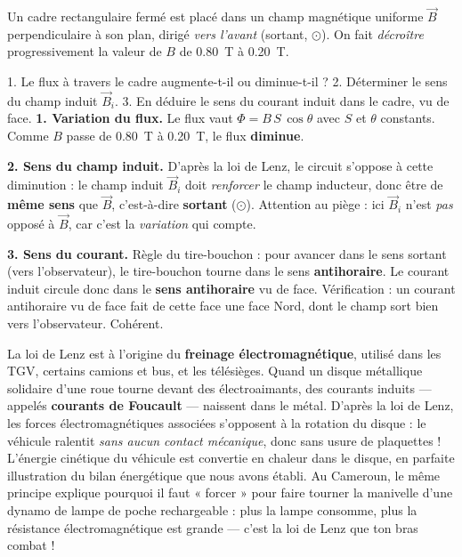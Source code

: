 \documentclass[11pt]{article}
\begin{document}
\begin{exoresolu}
Un cadre rectangulaire fermé est placé dans un champ magnétique uniforme $\vec{B}$ perpendiculaire à son plan, dirigé \emph{vers l'avant} (sortant, $\odot$). On fait \emph{décroître} progressivement la valeur de $B$ de \SI{0,80}{\tesla} à \SI{0,20}{\tesla}.

1. Le flux à travers le cadre augmente-t-il ou diminue-t-il ?
2. Déterminer le sens du champ induit $\vec{B}_i$.
3. En déduire le sens du courant induit dans le cadre, vu de face.
\tcblower
\textbf{1. Variation du flux.} Le flux vaut $\Phi = B\,S\,\cos\theta$ avec $S$ et $\theta$ constants. Comme $B$ passe de \SI{0,80}{\tesla} à \SI{0,20}{\tesla}, le flux \textbf{diminue}.

\textbf{2. Sens du champ induit.} D'après la loi de Lenz, le circuit s'oppose à cette diminution : le champ induit $\vec{B}_i$ doit \emph{renforcer} le champ inducteur, donc être de \textbf{même sens} que $\vec{B}$, c'est-à-dire \textbf{sortant} ($\odot$). Attention au piège : ici $\vec{B}_i$ n'est \emph{pas} opposé à $\vec{B}$, car c'est la \emph{variation} qui compte.

\textbf{3. Sens du courant.} Règle du tire-bouchon : pour avancer dans le sens sortant (vers l'observateur), le tire-bouchon tourne dans le sens \textbf{antihoraire}. Le courant induit circule donc dans le \textbf{sens antihoraire} vu de face. Vérification : un courant antihoraire vu de face fait de cette face une face Nord, dont le champ sort bien vers l'observateur. Cohérent.
\end{exoresolu}

\begin{savaistu}
La loi de Lenz est à l'origine du \textbf{freinage électromagnétique}, utilisé dans les TGV, certains camions et bus, et les télésièges. Quand un disque métallique solidaire d'une roue tourne devant des électroaimants, des courants induits — appelés \textbf{courants de Foucault} — naissent dans le métal. D'après la loi de Lenz, les forces électromagnétiques associées s'opposent à la rotation du disque : le véhicule ralentit \emph{sans aucun contact mécanique}, donc sans usure de plaquettes ! L'énergie cinétique du véhicule est convertie en chaleur dans le disque, en parfaite illustration du bilan énergétique que nous avons établi. Au Cameroun, le même principe explique pourquoi il faut « forcer » pour faire tourner la manivelle d'une dynamo de lampe de poche rechargeable : plus la lampe consomme, plus la résistance électromagnétique est grande — c'est la loi de Lenz que ton bras combat !
\end{savaistu}
\end{document}

